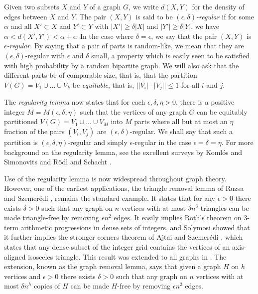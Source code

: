 \documentclass[11pt]{article}
\begin{document}
Given two subsets $X$ and $Y$ of a graph $G$, we write $d(X,Y)$ for the density
of edges between $X$ and $Y$. The pair $(X, Y)$ is said to be {\it
$(\epsilon,\delta)$-regular} if for some $\alpha$ and all $X' \subset X$ and
$Y' \subset Y$ with $|X'| \geq \delta |X|$ and $|Y'| \geq \delta |Y|$, we have
$\alpha<d(X',Y')<\alpha+\epsilon$. In the case where $\delta = \epsilon$, we
say that the pair $(X, Y)$ is {\it $\epsilon$-regular}. By saying that a pair
of parts is random-like, we mean that they are $(\epsilon, \delta)$-regular
with $\epsilon$ and $\delta$ small, a property which is easily seen to be
satisfied with high probability by a random bipartite graph. We will also ask that the
different parts be of comparable size, that is, that the partition $V(G) = V_1
\cup \ldots \cup V_k$ be {\it equitable}, that is, $||V_i|-|V_j|| \leq 1$ for
all $i$ and $j$.

The {\it regularity lemma} now states that for each $\epsilon,\delta,\eta > 0$,
there is a positive integer $M=M(\epsilon,\delta,\eta)$ such that the vertices
of any graph $G$ can be equitably partitioned $V(G) = V_1 \cup \ldots \cup V_M$
into $M$ parts where all but at most an $\eta$ fraction of the pairs
$(V_i,V_j)$ are $(\epsilon,\delta)$-regular. We shall say that such a partition
is $(\epsilon, \delta, \eta)$-regular and simply $\epsilon$-regular in the case
$\epsilon=\delta=\eta$. For more background on the regularity lemma, see the
excellent surveys by Koml\'os and Simonovits \cite{KoSi} and R\"odl and Schacht
\cite{RoSc}.

Use of the regularity lemma is now widespread throughout graph theory. However,
one of the earliest applications, the triangle removal lemma of Ruzsa and
Szemer\'edi \cite{RuSz}, remains the standard example. It states that for any
$\epsilon > 0$ there exists $\delta > 0$ such that any graph on $n$ vertices
with at most $\delta n^3$ triangles can be made triangle-free by removing
$\epsilon n^2$ edges. It easily implies Roth's theorem \cite{Ro} on 3-term
arithmetic progressions in dense sets of integers, and Solymosi \cite{So}
showed that it further implies the stronger corners theorem of Ajtai and
Szemer\'edi \cite{AjSz}, which states that any dense subset of the integer grid
contains the vertices of an axis-aligned isosceles triangle. This result was extended to all graphs in \cite{EFR,ADLRY}. The extension, known as the graph removal lemma, says that given a graph $H$ on $h$ vertices and $\epsilon > 0$ there exists $\delta > 0$ such that any graph on $n$ vertices with at most $\delta n^h$ copies of $H$ can be made $H$-free by removing $\epsilon n^2$ edges.
\end{document}
